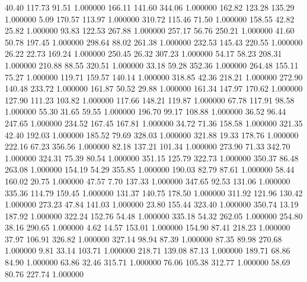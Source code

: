      40.40    117.73     91.51  1.000000
    166.11    141.60    344.06  1.000000
    162.82    123.28    135.29  1.000000
      5.09    170.57    113.97  1.000000
    310.72    115.46     71.50  1.000000
    158.55     42.82     25.82  1.000000
     93.83    122.53    267.88  1.000000
    257.17     56.76    250.21  1.000000
     41.60     50.78    197.45  1.000000
    298.64     88.02    261.38  1.000000
    232.53    145.43    220.55  1.000000
     26.22     22.73    169.24  1.000000
    250.45     26.32    307.23  1.000000
     54.17     58.23    208.31  1.000000
    210.88     88.55    320.51  1.000000
     33.18     59.28    352.36  1.000000
    264.48    155.11     75.27  1.000000
    119.71    159.57    140.14  1.000000
    318.85     42.36    218.21  1.000000
    272.90    140.48    233.72  1.000000
    161.87     50.52     29.88  1.000000
    161.34    147.97    170.62  1.000000
    127.90    111.23    103.82  1.000000
    117.66    148.21    119.87  1.000000
     67.78    117.91     98.58  1.000000
     55.30     31.65     59.55  1.000000
    196.70     99.17    108.88  1.000000
     36.52     96.44    247.65  1.000000
    234.52    167.45    167.81  1.000000
     34.72     71.36    158.58  1.000000
    321.35     42.40    192.03  1.000000
    185.52     79.69    328.03  1.000000
    321.88     19.33    178.76  1.000000
    222.16     67.23    356.56  1.000000
     82.18    137.21    101.34  1.000000
    273.90     71.33    342.70  1.000000
    324.31     75.39     80.54  1.000000
    351.15    125.79    322.73  1.000000
    350.37     86.48    263.08  1.000000
    154.19     54.29    355.85  1.000000
    190.03     82.79     87.61  1.000000
     58.44    160.02     20.75  1.000000
     47.57      7.70    137.33  1.000000
    347.65     92.53    131.06  1.000000
    335.36    114.79    159.45  1.000000
    131.37    140.75    178.50  1.000000
    311.92    121.96    130.42  1.000000
    273.23     47.84    141.03  1.000000
     23.80    155.44    323.40  1.000000
    350.74     13.19    187.92  1.000000
    322.24    152.76     54.48  1.000000
    335.18     54.32    262.05  1.000000
    254.80     38.16    290.65  1.000000
      4.62     14.57    153.01  1.000000
    154.90     87.41    218.23  1.000000
     37.97    106.91    326.82  1.000000
    327.14     98.94     87.39  1.000000
     87.35     89.98    270.68  1.000000
      9.81     33.14    103.71  1.000000
    218.71    139.08     87.13  1.000000
    189.71     68.86     84.90  1.000000
     63.86     32.46    315.71  1.000000
     76.06    105.38    312.77  1.000000
     58.69     80.76    227.74  1.000000
